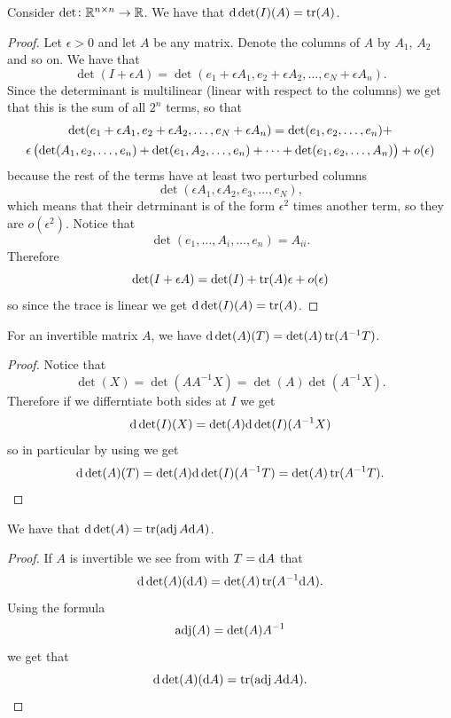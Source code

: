 \documentclass[11pt,a4paper]{article}
\begin{document}
\begin{lemma}
  \label{lem:ddet-at-I}
  Consider $\det \colon \mathbb{R}^{n \times n} \to \mathbb{R}$.
  We have that $\mathrm{d} \det(I)(A) = \operatorname{tr}(A)$.
\end{lemma}
\begin{proof}
  Let $\epsilon > 0$ and let $A$ be any matrix.
  Denote the columns of $A$ by $A_1$, $A_2$ and so on.
  We have that
  \[
    \det(I + \epsilon A) =
    \det(e_1 + \epsilon A_1, e_2 + \epsilon A_2, \dots , e_N + \epsilon A_n).
  \]
  Since the determinant is multilinear (linear with respect to
  the columns) we get that this is the sum of all $2^n$ terms,
  so that
  \begin{multline*}
    \det(e_1 + \epsilon A_1, e_2 + \epsilon A_2, \dots , e_N + \epsilon A_n) =
    \det(e_1,e_2, \dots ,e_n ) + \\
    \epsilon \del{\det(A_1,e_2,\dots,e_n) +
    \det(e_1,A_2,\dots, e_n) + \cdots +
    \det(e_1,e_2,\dots, A_n)} + o(\epsilon)
  \end{multline*}
  because the rest of the terms have at least two perturbed columns
  \[
    \det(\epsilon A_1,\epsilon A_2,e_3,\dots, e_N),
  \]
  which means that their detrminant is of the form $\epsilon^2$
  times another term, so they are $o(\epsilon^2)$.
  Notice that
  \[
    \det(e_1,\dots,A_i,\dots,e_n) = A_{ii}.
  \]
  Therefore
  \[
    \det(I + \epsilon A) = \det(I) +
    \operatorname{tr}(A) \epsilon + o(\epsilon)
  \]
  so since the trace is linear we get $\mathrm{d} \det(I)(A) = \operatorname{tr}(A)$.
\end{proof}

\begin{lemma}
  \label{lem:ddet-invertible-A}
  For an invertible matrix $A$,
  we have $\mathrm{d} \det(A)(T) = \det(A) \operatorname{tr}(A^{-1} T)$.
\end{lemma}
\begin{proof}
  Notice that
  \[
    \det(X) = \det(AA^{-1}X) = \det(A) \det(A^{-1}X).
  \]
  Therefore if we differntiate both sides at $I$ we get
  \[
    \mathrm{d} \det(I)(X) = \det(A) \mathrm{d} \det(I)(A^{-1}X)
  \]
  so in particular by using  we get
  \[
    \mathrm{d} \det(A)(T) =
    \det(A) \mathrm{d} \det(I)(A^{-1}T) =
    \det(A) \operatorname{tr}(A^{-1}T).
  \]
\end{proof}

\begin{proposition}
  We have that $\mathrm{d} \det(A) = \operatorname{tr}(\operatorname{adj} A \mathrm{d} A)$.
\end{proposition}
\begin{proof}
  If $A$ is invertible we see from 
  with $T = \mathrm{d} A$ that
  \[
    \mathrm{d} \det(A)(\mathrm{d} A) =
    \det(A) \operatorname{tr}(A^{-1} \mathrm{d} A).
  \]
  Using the formula
  \[
    \operatorname{adj}(A) = \det(A) A^{-1}
  \]
  we get that
  \[
    \mathrm{d} \det(A)(\mathrm{d} A) =
    \operatorname{tr}(\operatorname{adj} A \mathrm{d} A).
  \]
\end{proof}
\end{document}

